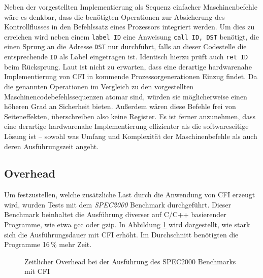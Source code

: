 Neben der vorgestellten Implementierung als Sequenz einfacher Maschinenbefehle wäre es denkbar, dass die benötigten Operationen zur Absicherung des Kontrollflusses in den Befehlssatz eines Prozessors integriert werden. Um dies zu erreichen wird neben einem \texttt{label ID} eine Anweisung \texttt{call ID, DST} benötigt, die einen Sprung an die Adresse \texttt{DST} nur durchführt, falls an dieser Codestelle die entsprechende \texttt{ID} als Label eingetragen ist. Identisch hierzu prüft auch \texttt{ret ID} beim Rücksprung. Laut \cite[S.9]{Abadi.2009} ist nicht zu erwarten, dass eine derartige hardwarenahe Implementierung von CFI in kommende Prozessorgenerationen Einzug findet. Da die genannten Operationen im Vergleich zu den vorgestellten Maschinencodebefehlssequenzen atomar sind, würden sie möglicherweise einen höheren Grad an Sicherheit bieten. Außerdem wären diese Befehle frei von Seiteneffekten, überschreiben also keine Register. Es ist ferner anzunehmen, dass eine derartige hardwarenahe Implementierung effizienter als die softwareseitige Lösung ist -- sowohl was Umfang und Komplexität der Maschinenbefehle als auch deren Ausführungszeit angeht.

\subsection{Overhead}
\label{sec:overhead}


Um festzustellen, welche zusätzliche Last durch die Anwendung von CFI erzeugt wird, wurden Tests mit dem \emph{SPEC2000} Benchmark durchgeführt. Dieser Benchmark beinhaltet die Ausführung diverser auf C/C++ basierender Programme, wie etwa gcc oder gzip. In Abbildung \ref{img:time.overhead} wird dargestellt, wie stark sich die Ausführungsdauer mit CFI erhöht. Im Durchschnitt benötigten die Programme 16\,\% mehr Zeit.

\begin{figure}[ht!]
	\centering
	\caption{Zeitlicher Overhead bei der Ausführung des SPEC2000 Benchmarks mit CFI}
	\label{img:time.overhead}
\end{figure}


